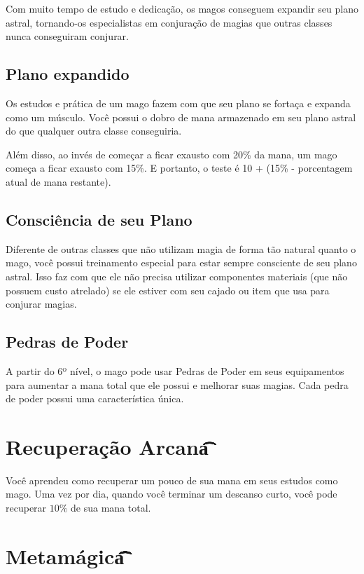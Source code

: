 \documentclass{RPG_Adventure}[2021/10/20]
\begin{document}
Com muito tempo de estudo e dedicação, os magos conseguem expandir seu plano
astral, tornando-os especialistas em conjuração de magias que outras classes
nunca conseguiram conjurar.

\subsection*{Plano expandido}%
\label{sub:plano_expandido}

Os estudos e prática de um mago fazem com que seu plano se fortaça e expanda
como um músculo. Você possui o dobro de mana armazenado em seu plano astral do
que qualquer outra classe conseguiria.

Além disso, ao invés de começar a ficar exausto com 20\% da mana, um mago
começa a ficar exausto com 15\%. E portanto, o teste é 10 + (15\% - porcentagem
atual de mana restante).


\subsection*{Consciência de seu Plano}%
\label{sub:consciencia_de_seu_plano}

Diferente de outras classes que não utilizam magia de forma tão natural quanto o
mago, você possui treinamento especial para estar sempre consciente de seu
plano astral.
Isso faz com que ele não precisa utilizar componentes materiais (que não possuem
custo atrelado) se ele estiver com seu cajado ou item que usa para conjurar
magias.

\subsection*{Pedras de Poder}%
\label{sub:pedras_de_poder}

A partir do 6º nível, o mago pode usar Pedras de Poder em seus equipamentos para
aumentar a mana total que ele possui e melhorar suas magias. Cada pedra de poder
possui uma característica única.

\section*{Recuperação Arcana\t\t\t\t\t}%
\label{sec:recuperacao_arcana}

Você aprendeu como recuperar um pouco de sua mana em seus estudos como mago. Uma
vez por dia, quando você terminar um descanso curto, você pode recuperar $10\%$
de sua mana total.

\section*{Metamágica\t\t\t\t\t\t\t\t\t\t\t}%
\label{sec:metamagica}
\end{document}
